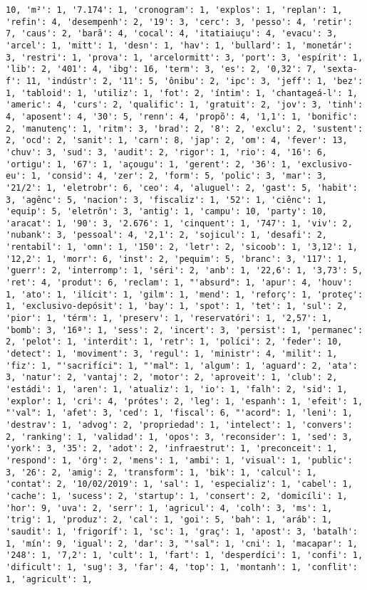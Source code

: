 \documentclass[11pt]{article}
\begin{document}
\begin{Verbatim}[commandchars=\\\{\}]
10, 'm²': 1, '7.174': 1, 'cronogram': 1, 'explos': 1, 'replan': 1, 'refin': 4, 'desempenh': 2, '19': 3, 'cerc': 3, 'pesso': 4, 'retir': 7, 'caus': 2, 'barã': 4, 'cocal': 4, 'itatiaiuçu': 4, 'evacu': 3, 'arcel': 1, 'mitt': 1, 'desn': 1, 'hav': 1, 'bullard': 1, 'monetár': 3, 'restri': 1, 'prova': 1, 'arcelormitt': 3, 'port': 3, 'espírit': 1, 'lib': 2, '401': 4, 'ibg': 16, 'term': 3, 'es': 2, '0,32': 7, 'sexta-f': 11, 'indústr': 2, '11': 5, 'ônibu': 2, 'ipc': 3, 'jeff': 1, 'bez': 1, 'tabloid': 1, 'utiliz': 1, 'fot': 2, 'íntim': 1, 'chantageá-l': 1, 'americ': 4, 'curs': 2, 'qualific': 1, 'gratuit': 2, 'jov': 3, 'tinh': 4, 'aposent': 4, '30': 5, 'renn': 4, 'propõ': 4, '1,1': 1, 'bonific': 2, 'manutenç': 1, 'ritm': 3, 'brad': 2, '8': 2, 'exclu': 2, 'sustent': 2, 'ocd': 2, 'sanit': 1, 'carn': 8, 'jap': 2, 'om': 4, 'fever': 13, 'chuv': 3, 'sud': 3, 'audit': 2, 'rigor': 1, 'rio': 4, '16': 6, 'ortigu': 1, '67': 1, 'açougu': 1, 'gerent': 2, '36': 1, 'exclusivo-eu': 1, 'consid': 4, 'zer': 2, 'form': 5, 'polic': 3, 'mar': 3, '21/2': 1, 'eletrobr': 6, 'ceo': 4, 'aluguel': 2, 'gast': 5, 'habit': 3, 'agênc': 5, 'nacion': 3, 'fiscaliz': 1, '52': 1, 'ciênc': 1, 'equip': 5, 'eletrôn': 3, 'antig': 1, 'campu': 10, 'party': 10, 'aracat': 1, '90': 3, '2.676': 1, 'cinquent': 1, '747': 1, 'viv': 2, 'nubank': 3, 'pessoal': 4, '2,1': 2, 'sojicul': 1, 'desafi': 2, 'rentabil': 1, 'omn': 1, '150': 2, 'letr': 2, 'sicoob': 1, '3,12': 1, '12,2': 1, 'morr': 6, 'inst': 2, 'pequim': 5, 'branc': 3, '117': 1, 'guerr': 2, 'interromp': 1, 'séri': 2, 'anb': 1, '22,6': 1, '3,73': 5, 'ret': 4, 'produt': 6, 'reclam': 1, "'absurd": 1, 'apur': 4, 'houv': 1, 'ato': 1, 'ilícit': 1, 'gilm': 1, 'mend': 1, 'reforç': 1, 'proteç': 1, 'exclusivo-depósit': 1, 'bay': 1, 'spot': 1, 'tet': 1, 'sul': 2, 'pior': 1, 'térm': 1, 'preserv': 1, 'reservatóri': 1, '2,57': 1, 'bomb': 3, '16ª': 1, 'sess': 2, 'incert': 3, 'persist': 1, 'permanec': 2, 'pelot': 1, 'interdit': 1, 'retr': 1, 'políci': 2, 'feder': 10, 'detect': 1, 'moviment': 3, 'regul': 1, 'ministr': 4, 'milit': 1, 'fiz': 1, "'sacrifíci": 1, "'mal": 1, 'algum': 1, 'aguard': 2, 'ata': 3, 'natur': 2, 'vantaj': 2, 'motor': 2, 'aproveit': 1, 'club': 2, 'estádi': 1, 'aren': 1, 'atualiz': 1, 'io': 1, 'falh': 2, 'sid': 1, 'explor': 1, 'cri': 4, 'prótes': 2, 'leg': 1, 'espanh': 1, 'efeit': 1, "'val": 1, 'afet': 3, 'ced': 1, 'fiscal': 6, "'acord": 1, 'leni': 1, 'destrav': 1, 'advog': 2, 'propriedad': 1, 'intelect': 1, 'convers': 2, 'ranking': 1, 'validad': 1, 'opos': 3, 'reconsider': 1, 'sed': 3, 'york': 3, '35': 2, 'adot': 2, 'infraestrut': 1, 'preconceit': 1, 'respond': 1, 'órg': 2, 'mens': 1, 'ambi': 1, 'visual': 1, 'public': 3, '26': 2, 'amig': 2, 'transform': 1, 'bik': 1, 'calcul': 1, 'contat': 2, '10/02/2019': 1, 'sal': 1, 'especializ': 1, 'cabel': 1, 'cache': 1, 'sucess': 2, 'startup': 1, 'consert': 2, 'domicíli': 1, 'hor': 9, 'uva': 2, 'serr': 1, 'agricul': 4, 'colh': 3, 'ms': 1, 'trig': 1, 'produz': 2, 'cal': 1, 'goi': 5, 'bah': 1, 'aráb': 1, 'saudit': 1, 'frigoríf': 1, 'sc': 1, 'graç': 1, 'apost': 3, 'batalh': 1, 'mín': 9, 'igual': 2, 'dar': 3, "'sal": 1, 'cni': 1, 'macapar': 1, '248': 1, '7,2': 1, 'cult': 1, 'fart': 1, 'desperdíci': 1, 'confi': 1, 'dificult': 1, 'sug': 3, 'far': 4, 'top': 1, 'montanh': 1, 'conflit': 1, 'agricult': 1, 
\end{Verbatim}
\end{document}
